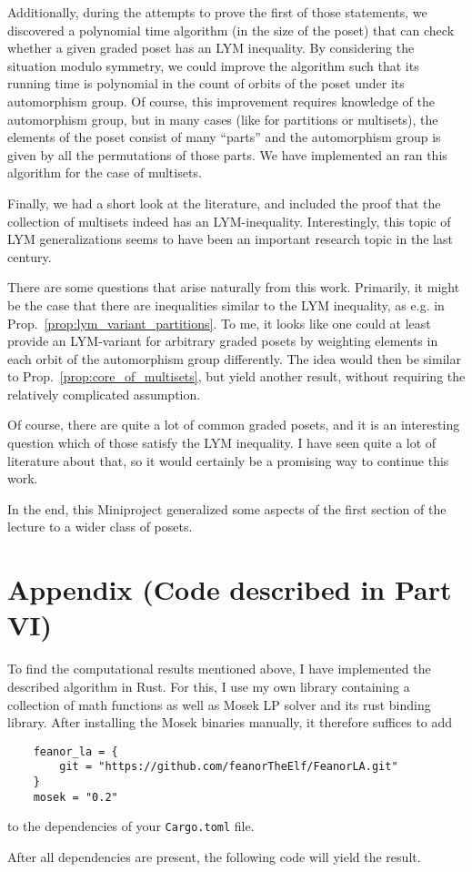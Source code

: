 \documentclass{scrartcl}
\theoremstyle{definition}
\begin{document}
Additionally, during the attempts to prove the first of those statements, we discovered a polynomial time algorithm (in the size of the poset) that can check whether a given graded poset has an LYM inequality.
By considering the situation modulo symmetry, we could improve the algorithm such that its running time is polynomial in the count of orbits of the poset under its automorphism group.
Of course, this improvement requires knowledge of the automorphism group, but in many cases (like for partitions or multisets), the elements of the poset consist of many ``parts'' and the automorphism group is given by all the permutations of those parts.
We have implemented an ran this algorithm for the case of multisets.

Finally, we had a short look at the literature, and included the proof that the collection of multisets indeed has an LYM-inequality.
Interestingly, this topic of LYM generalizations seems to have been an important research topic in the last century.

There are some questions that arise naturally from this work.
Primarily, it might be the case that there are inequalities similar to the LYM inequality, as e.g. in Prop.~\ref{prop:lym_variant_partitions}.
To me, it looks like one could at least provide an LYM-variant for arbitrary graded posets by weighting elements in each orbit of the automorphism group differently.
The idea would then be similar to Prop.~\ref{prop:core_of_multisets}, but yield another result, without requiring the relatively complicated assumption.

Of course, there are quite a lot of common graded posets, and it is an interesting question which of those satisfy the LYM inequality.
I have seen quite a lot of literature about that, so it would certainly be a promising way to continue this work.

In the end, this Miniproject generalized some aspects of the first section of the lecture to a wider class of posets.

\section{Appendix (Code described in Part VI)}
To find the computational results mentioned above, I have implemented the described algorithm in Rust.
For this, I use my own library containing a collection of math functions as well as Mosek LP solver \cite{mosek} and its rust binding library.
After installing the Mosek binaries manually, it therefore suffices to add
\begin{lstlisting}
    feanor_la = { 
        git = "https://github.com/feanorTheElf/FeanorLA.git"  
    }
    mosek = "0.2"
\end{lstlisting}
to the dependencies of your \texttt{Cargo.toml} file.

After all dependencies are present, the following code will yield the result.


\printbibliography
\end{document}
